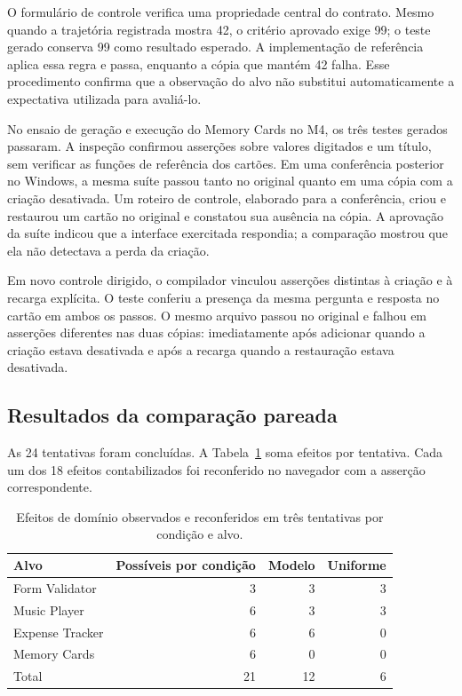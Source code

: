 \documentclass[12pt]{article}
\begin{document}
O formulário de controle verifica uma propriedade central do contrato. Mesmo quando a trajetória registrada mostra 42, o critério aprovado exige 99; o teste gerado conserva 99 como resultado esperado. A implementação de referência aplica essa regra e passa, enquanto a cópia que mantém 42 falha. Esse procedimento confirma que a observação do alvo não substitui automaticamente a expectativa utilizada para avaliá-lo.

No ensaio de geração e execução do Memory Cards no M4, os três testes gerados passaram. A inspeção confirmou asserções sobre valores digitados e um título, sem verificar as funções de referência dos cartões. Em uma conferência posterior no Windows, a mesma suíte passou tanto no original quanto em uma cópia com a criação desativada. Um roteiro de controle, elaborado para a conferência, criou e restaurou um cartão no original e constatou sua ausência na cópia. A aprovação da suíte indicou que a interface exercitada respondia; a comparação mostrou que ela não detectava a perda da criação.

Em novo controle dirigido, o compilador vinculou asserções distintas à criação e à recarga explícita. O teste conferiu a presença da mesma pergunta e resposta no cartão em ambos os passos. O mesmo arquivo passou no original e falhou em asserções diferentes nas duas cópias: imediatamente após adicionar quando a criação estava desativada e após a recarga quando a restauração estava desativada.

\subsection{Resultados da comparação pareada}
As 24 tentativas foram concluídas. A Tabela~\ref{tab:comparison} soma efeitos por tentativa. Cada um dos 18 efeitos contabilizados foi reconferido no navegador com a asserção correspondente.

\begin{table}[ht]
\centering\small
\caption{Efeitos de domínio observados e reconferidos em três tentativas por condição e alvo.}
\label{tab:comparison}
\begin{tabular}{lrrr}
\toprule
Alvo & Possíveis por condição & Modelo & Uniforme \\
\midrule
Form Validator & 3 & 3 & 3 \\
Music Player & 6 & 3 & 3 \\
Expense Tracker & 6 & 6 & 0 \\
Memory Cards & 6 & 0 & 0 \\
\midrule
Total & 21 & 12 & 6 \\
\bottomrule
\end{tabular}
\end{table}
\end{document}
